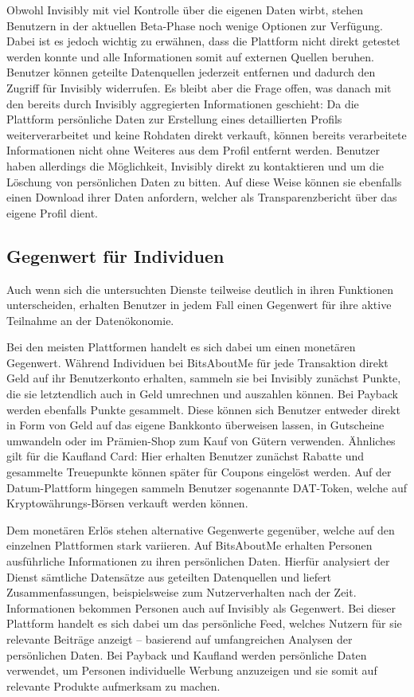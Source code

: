 \noindent Obwohl Invisibly mit viel Kontrolle über die eigenen Daten wirbt, stehen Benutzern in der aktuellen Beta-Phase noch wenige Optionen zur Verfügung. Dabei ist es jedoch wichtig zu erwähnen, dass die Plattform nicht direkt getestet werden konnte und alle Informationen somit auf externen Quellen beruhen. Benutzer können geteilte Datenquellen jederzeit entfernen und dadurch den Zugriff für Invisibly widerrufen. Es bleibt aber die Frage offen, was danach mit den bereits durch Invisibly aggregierten Informationen geschieht: Da die Plattform persönliche Daten zur Erstellung eines detaillierten Profils weiterverarbeitet und keine Rohdaten direkt verkauft, können bereits verarbeitete Informationen nicht ohne Weiteres aus dem Profil entfernt werden. Benutzer haben allerdings die Möglichkeit, Invisibly direkt zu kontaktieren und um die Löschung von persönlichen Daten zu bitten. Auf diese Weise können sie ebenfalls einen Download ihrer Daten anfordern, welcher als Transparenzbericht über das eigene Profil dient.

\subsection{Gegenwert für Individuen}
Auch wenn sich die untersuchten Dienste teilweise deutlich in ihren Funktionen unterscheiden, erhalten Benutzer in jedem Fall einen Gegenwert für ihre aktive Teilnahme an der Datenökonomie. \newline

\noindent Bei den meisten Plattformen handelt es sich dabei um einen monetären Gegenwert. Während Individuen bei BitsAboutMe für jede Transaktion direkt Geld auf ihr Benutzerkonto erhalten, sammeln sie bei Invisibly zunächst Punkte, die sie letztendlich auch in Geld umrechnen und auszahlen können. Bei Payback werden ebenfalls Punkte gesammelt. Diese können sich Benutzer entweder direkt in Form von Geld auf das eigene Bankkonto überweisen lassen, in Gutscheine umwandeln oder im Prämien-Shop zum Kauf von Gütern verwenden. Ähnliches gilt für die Kaufland Card: Hier erhalten Benutzer zunächst Rabatte und gesammelte Treuepunkte können später für Coupons eingelöst werden. Auf der Datum-Plattform hingegen sammeln Benutzer sogenannte DAT-Token, welche auf Kryptowährungs-Börsen verkauft werden können.\newline

\noindent Dem monetären Erlös stehen alternative Gegenwerte gegenüber, welche auf den einzelnen Plattformen stark variieren. Auf BitsAboutMe erhalten Personen ausführliche Informationen zu ihren persönlichen Daten. Hierfür analysiert der Dienst sämtliche Datensätze aus geteilten Datenquellen und liefert Zusammenfassungen, beispielsweise zum Nutzerverhalten nach der Zeit. Informationen bekommen Personen auch auf Invisibly als Gegenwert. Bei dieser Plattform handelt es sich dabei um das persönliche Feed, welches Nutzern für sie relevante Beiträge anzeigt -- basierend auf umfangreichen Analysen der persönlichen Daten. Bei Payback und Kaufland werden persönliche Daten verwendet, um Personen individuelle Werbung anzuzeigen und sie somit auf relevante Produkte aufmerksam zu machen.
